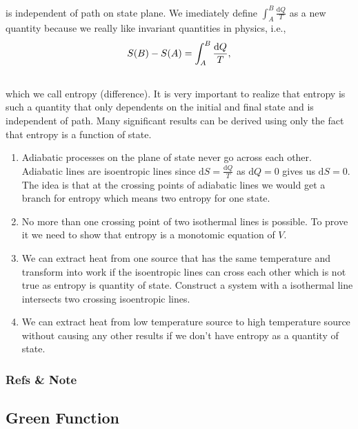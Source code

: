 \documentclass[letterpaper,10pt,english]{sphinxmanual}
\begin{document}
is independent of path on state plane. We imediately define $\int_A^B \frac{\mathrm d Q}{T}$ as a new quantity because we really like invariant quantities in physics, i.e.,
\begin{gather}
\begin{split}S(B) - S(A) = \int_A^B \frac{\mathrm d Q}{T},\end{split}\notag\\\begin{split}\end{split}\notag
\end{gather}
which we call entropy (difference). It is very important to realize that entropy is such a quantity that only dependents on the initial and final state and is independent of path. Many significant results can be derived using only the fact that entropy is a function of state.
\begin{enumerate}
\item {} 
Adiabatic processes on the plane of state never go across each other. Adiabatic lines are isoentropic lines since $\mathrm dS = \frac{\mathrm dQ}{T}$ as $\mathrm dQ = 0$ gives us $\mathrm dS = 0$. The idea is that at the crossing points of adiabatic lines we would get a branch for entropy which means two entropy for one state.

\item {} 
No more than one crossing point of two isothermal lines is possible. To prove it we need to show that entropy is a monotomic equation of $V$.

\item {} 
We can extract heat from one source that has the same temperature and transform into work if the isoentropic lines can cross each other which is not true as entropy is quantity of state. Construct a system with a isothermal line intersects two crossing isoentropic lines.

\item {} 
We can extract heat from low temperature source to high temperature source without causing any other results if we don't have entropy as a quantity of state.

\end{enumerate}


\subsubsection{Refs \& Note}
\label{vocabulary/vocabulary:refs-note}

\subsection{Green Function}
\label{vocabulary/green:green-function}\label{vocabulary/green::doc}
\end{document}

